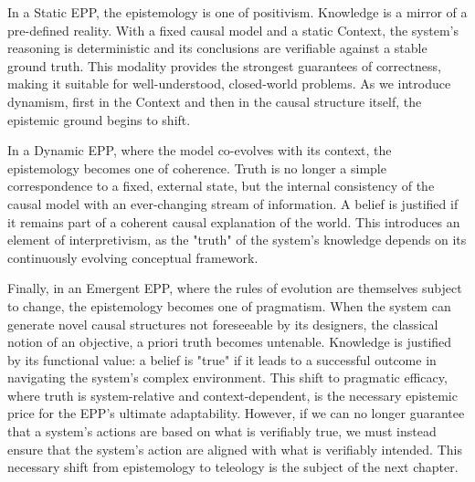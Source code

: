 In a Static EPP, the epistemology is one of positivism. Knowledge is a mirror of a pre-defined reality. With a fixed causal model and a static Context, the system's reasoning is deterministic and its conclusions are verifiable against a stable ground truth. This modality provides the strongest guarantees of correctness, making it suitable for well-understood, closed-world problems. As we introduce dynamism, first in the Context and then in the causal structure itself, the epistemic ground begins to shift.

In a Dynamic EPP, where the model co-evolves with its context, the epistemology becomes one of coherence. Truth is no longer a simple correspondence to a fixed, external state, but the internal consistency of the causal model with an ever-changing stream of information. A belief is justified if it remains part of a coherent causal explanation of the world. This introduces an element of interpretivism, as the "truth" of the system's knowledge depends on its continuously evolving conceptual framework.

Finally, in an Emergent EPP, where the rules of evolution are themselves subject to change, the epistemology becomes one of  pragmatism. When the system can generate novel causal structures not foreseeable by its designers, the classical notion of an objective, a priori truth becomes untenable. Knowledge is justified by its functional value: a belief is "true" if it leads to a successful outcome in navigating the system's complex environment. This shift to pragmatic efficacy, where truth is system-relative and context-dependent, is the necessary epistemic price for the EPP's ultimate adaptability. However, if we can no longer guarantee that a system's actions are based on what is verifiably true, we must instead ensure that the system's action are aligned with what is verifiably intended. This necessary shift from epistemology to teleology is the subject of the next chapter.


\newpage
